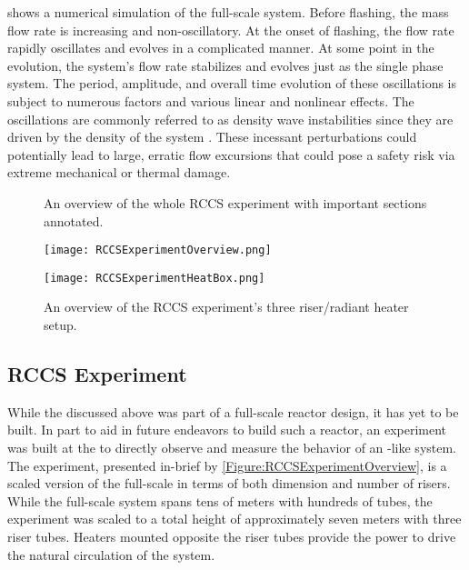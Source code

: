  shows a numerical simulation of the full-scale system.
Before flashing, the mass flow rate is increasing and non-oscillatory.
At the onset of flashing, the flow rate rapidly oscillates and evolves in a complicated manner.
At some point in the evolution, the system's flow rate stabilizes and evolves just as the single phase system.
The period, amplitude, and overall time evolution of these oscillations is subject to numerous factors and various linear and nonlinear effects.
The oscillations are commonly referred to as density wave instabilities since they are driven by the density of the system \cite{achard_analysis_1985}.
These incessant perturbations could potentially lead to large, erratic flow excursions that could pose a safety risk 
via extreme mechanical or thermal damage.

\begin{figure}%
    \centering
    \caption[RCCS Experiment Full System diagram]{An overview of the whole RCCS experiment with important sections annotated.}%
    \label{Figure:RCCSExperimentOverview}%
    \texttt{[image: RCCSExperimentOverview.png]}
    \vspace*{4em}
    \centering
    \caption[RCCS Experiment Three Riser diagram]{An overview of the RCCS experiment's three riser/radiant heater setup.}%
    \label{Figure:RCCSExperimentHeatBox}%
    \texttt{[image: RCCSExperimentHeatBox.png]}%
\end{figure}


\subsection{\TheUniversity{} RCCS Experiment}
While the  discussed above was part of a full-scale reactor design, it has yet to be built.
In part to aid in future endeavors to build such a reactor, an experiment was built at the \TheUniversity{} to directly observe and measure the behavior of an -like system.
The experiment, presented in-brief by \cref{Figure:RCCSExperimentOverview}, is a scaled version of the full-scale  in terms of both dimension and number of risers.
While the full-scale system spans tens of meters with hundreds of tubes, the experiment was scaled to a total height of approximately seven meters with three riser tubes.
Heaters mounted opposite the riser tubes provide the power to drive the natural circulation of the system.

